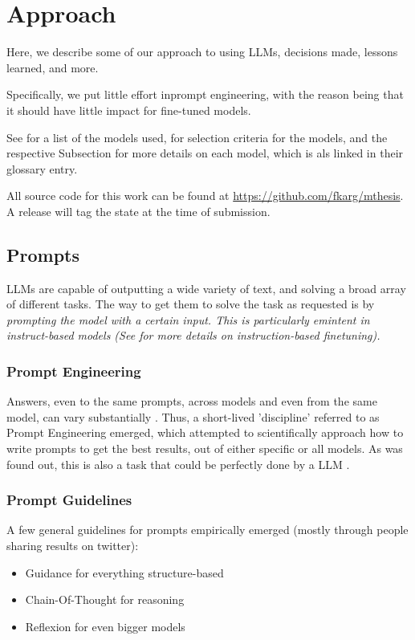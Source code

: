 \chapter{Approach}\label{chap:approach}
Here, we describe some of our approach to using \glspl{LLM}, decisions made, lessons learned, and more.

Specifically, we put little effort inprompt engineering, with the reason being that it should have little impact for fine-tuned models.



See  for a list of the models used,  for selection criteria for the models, and the respective Subsection for more details on each model, which is als linked in their glossary entry.

All source code for this work can be found at \url{https://github.com/fkarg/mthesis}.
A release will tag the state at the time of submission.

\section{Prompts}\label{sec:prompts}
\glspl{LLM} are capable of outputting a wide variety of text, and solving a broad array of different tasks.
The way to get them to solve the task as requested is by \em{prompting} the model with a certain input.
This is particularly emintent in instruct-based models (See  for more details on instruction-based finetuning).

\subsection{Prompt Engineering}\label{sub:engineering}
Answers, even to the same prompts, across models and even from the same model, can vary substantially \cite{chen_how_2023}.
Thus, a short-lived 'discipline' referred to as Prompt Engineering emerged, which attempted to scientifically approach how to write prompts to get the best results, out of either specific or all models.
As was found out, this is also a task that could be perfectly done by a \gls{LLM} \cite{zhou_large_2022}.

\subsection{Prompt Guidelines}\label{sub:guidelines}
A few general guidelines for prompts empirically emerged (mostly through people sharing results on twitter):
\begin{itemize}
    \item Guidance for everything structure-based \cite{guidance_2023}
    \item Chain-Of-Thought for reasoning \cite{wei_chainofthought_2022}
    \item Reflexion for even bigger models \cite{shinn_reflexion_2023}
\end{itemize}

